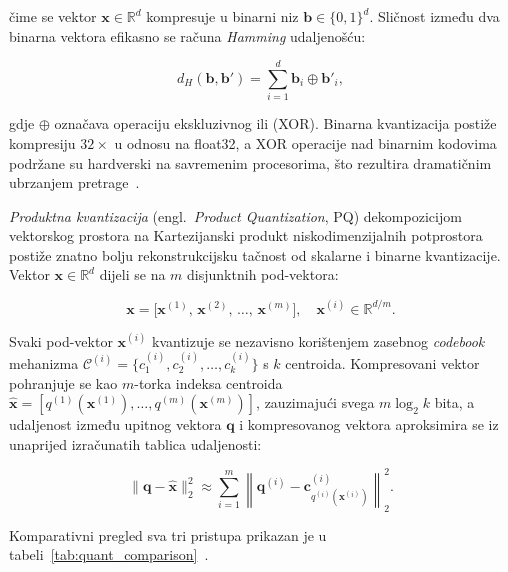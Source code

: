 \noindent čime se vektor $\mathbf{x} \in \mathbb{R}^d$ kompresuje u
binarni niz $\mathbf{b} \in \{0,1\}^d$.
Sličnost između dva binarna vektora efikasno se računa
\foreignlanguage{english}{\emph{Hamming}} udaljenošću:

\begin{equation}
    d_H(\mathbf{b}, \mathbf{b}') =
    \sum_{i=1}^{d} \mathbf{b}_i \oplus \mathbf{b}'_i,
    \label{eq:hamming}
\end{equation}

\noindent gdje $\oplus$ označava operaciju ekskluzivnog ili (XOR).
Binarna kvantizacija postiže kompresiju $32\times$ u odnosu na
\foreignlanguage{english}{float32}, a XOR operacije nad binarnim
kodovima podržane su hardverski na savremenim procesorima, što
rezultira dramatičnim ubrzanjem pretrage~\cite{ma2026comprehensive}.

\emph{Produktna kvantizacija}
(engl.\ \foreignlanguage{english}{\emph{Product Quantization}}, PQ)
dekompozicijom vektorskog prostora na Kartezijanski produkt
niskodimenzijalnih potprostora postiže znatno bolju
rekonstrukcijsku tačnost od skalarne i binarne kvantizacije.
Vektor $\mathbf{x} \in \mathbb{R}^d$ dijeli se na $m$ disjunktnih
pod-vektora:

\begin{equation}
    \mathbf{x} = \bigl[\mathbf{x}^{(1)},\, \mathbf{x}^{(2)},\,
    \dots,\, \mathbf{x}^{(m)}\bigr],
    \quad \mathbf{x}^{(i)} \in \mathbb{R}^{d/m}.
    \label{eq:pq_split}
\end{equation}

\noindent Svaki pod-vektor $\mathbf{x}^{(i)}$ kvantizuje se nezavisno
korištenjem zasebnog \foreignlanguage{english}{\emph{codebook}} mehanizma
$\mathcal{C}^{(i)} = \{c_1^{(i)}, c_2^{(i)}, \dots, c_k^{(i)}\}$
s $k$ centroida. Kompresovani vektor pohranjuje se kao $m$-torka indeksa
centroida $\hat{\mathbf{x}} = [q^{(1)}(\mathbf{x}^{(1)}), \dots,
q^{(m)}(\mathbf{x}^{(m)})]$, zauzimajući svega $m \log_2 k$ bita,
a udaljenost između upitnog vektora $\mathbf{q}$ i kompresovanog
vektora aproksimira se iz unaprijed izračunatih tablica udaljenosti:

\begin{equation}
    \|\mathbf{q} - \hat{\mathbf{x}}\|_2^2 \approx
    \sum_{i=1}^{m}
    \left\|\mathbf{q}^{(i)} -
    \mathbf{c}^{(i)}_{q^{(i)}(\mathbf{x}^{(i)})}\right\|_2^2.
    \label{eq:pq_dist}
\end{equation}

\noindent Komparativni pregled sva tri pristupa prikazan je u
tabeli~\ref{tab:quant_comparison}~\cite{raja2026memory}.

